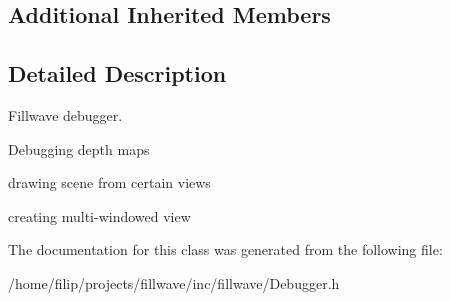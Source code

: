\subsection*{Additional Inherited Members}


\subsection{Detailed Description}
Fillwave debugger. 


\begin{DoxyItemize}
\item Debugging depth maps
\item drawing scene from certain views
\item creating multi-\/windowed view 
\end{DoxyItemize}

The documentation for this class was generated from the following file\+:\begin{DoxyCompactItemize}
\item 
/home/filip/projects/fillwave/inc/fillwave/Debugger.\+h\end{DoxyCompactItemize}
